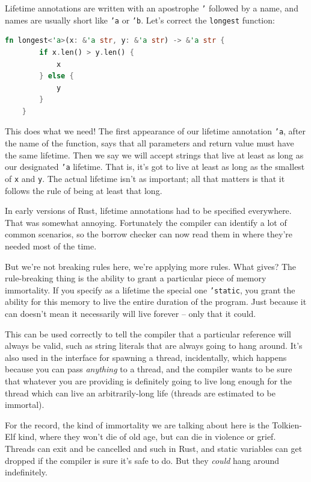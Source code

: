 Lifetime annotations are written with an apostrophe \texttt{'} followed by a name, and names are usually short like \texttt{'a} or \texttt{'b}. Let's correct the \texttt{longest} function:

\begin{lstlisting}[language=Rust]
    fn longest<'a>(x: &'a str, y: &'a str) -> &'a str {
        if x.len() > y.len() {
            x
        } else {
            y
        }
    }
\end{lstlisting}

This does what we need! The first appearance of our lifetime annotation \texttt{'a}, after the name of the function, says that all parameters and return value must have the same lifetime. Then we say we will accept strings that live at least as long as our designated \texttt{'a} lifetime. That is, it's got to live at least as long as the smallest of \texttt{x} and \texttt{y}. The actual lifetime isn't as important; all that matters is that it follows the rule of being at least that long.

In early versions of Rust, lifetime annotations had to be specified everywhere. That was somewhat annoying. Fortunately the compiler can identify a lot of common scenarios, so the borrow checker can now read them in where they're needed most of the time.


But we're not breaking rules here, we're applying more rules. What gives? The rule-breaking thing is the ability to grant a particular piece of memory immortality. If you specify as a lifetime the special one \texttt{'static}, you grant the ability for this memory to live the entire duration of the program. Just because it can doesn't mean it necessarily will live forever -- only that it could. 

This can be used correctly to tell the compiler that a particular reference will always be valid, such as string literals that are always going to hang around. It's also used in the interface for spawning a thread, incidentally, which happens because you can pass \textit{anything} to a thread, and the compiler wants to be sure that whatever you are providing is definitely going to live long enough for the thread which can live an arbitrarily-long life (threads are estimated to be immortal). 

For the record, the kind of immortality we are talking about here is the Tolkien-Elf kind, where they won't die of old age, but can die in violence or grief. Threads can exit and be cancelled and such in Rust, and static variables can get dropped if the compiler is sure it's safe to do. But they \textit{could} hang around indefinitely.

